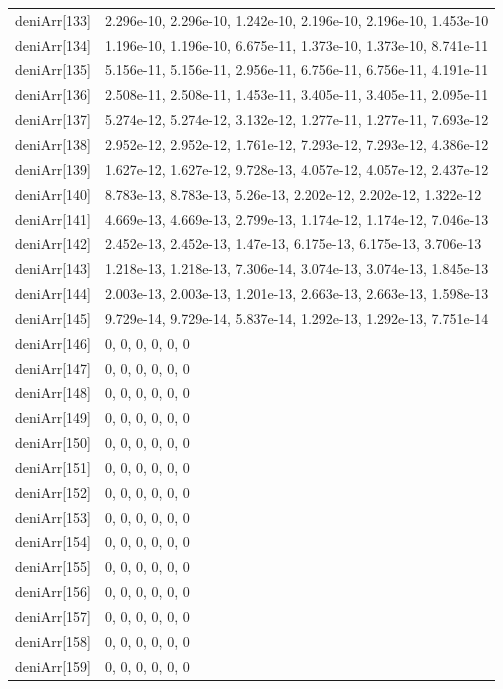 {\begin{longtable}{p{}p{}}
{}deniArr[133] & 2.296e-10, 2.296e-10, 1.242e-10, 2.196e-10, 2.196e-10, 1.453e-10\\
{}deniArr[134] & 1.196e-10, 1.196e-10, 6.675e-11, 1.373e-10, 1.373e-10, 8.741e-11\\
{}deniArr[135] & 5.156e-11, 5.156e-11, 2.956e-11, 6.756e-11, 6.756e-11, 4.191e-11\\
{}deniArr[136] & 2.508e-11, 2.508e-11, 1.453e-11, 3.405e-11, 3.405e-11, 2.095e-11\\
{}deniArr[137] & 5.274e-12, 5.274e-12, 3.132e-12, 1.277e-11, 1.277e-11, 7.693e-12\\
{}deniArr[138] & 2.952e-12, 2.952e-12, 1.761e-12, 7.293e-12, 7.293e-12, 4.386e-12\\
{}deniArr[139] & 1.627e-12, 1.627e-12, 9.728e-13, 4.057e-12, 4.057e-12, 2.437e-12\\
{}deniArr[140] & 8.783e-13, 8.783e-13, 5.26e-13, 2.202e-12, 2.202e-12, 1.322e-12\\
{}deniArr[141] & 4.669e-13, 4.669e-13, 2.799e-13, 1.174e-12, 1.174e-12, 7.046e-13\\
{}deniArr[142] & 2.452e-13, 2.452e-13, 1.47e-13, 6.175e-13, 6.175e-13, 3.706e-13\\
{}deniArr[143] & 1.218e-13, 1.218e-13, 7.306e-14, 3.074e-13, 3.074e-13, 1.845e-13\\
{}deniArr[144] & 2.003e-13, 2.003e-13, 1.201e-13, 2.663e-13, 2.663e-13, 1.598e-13\\
{}deniArr[145] & 9.729e-14, 9.729e-14, 5.837e-14, 1.292e-13, 1.292e-13, 7.751e-14\\
{}deniArr[146] & 0, 0, 0, 0, 0, 0\\
{}deniArr[147] & 0, 0, 0, 0, 0, 0\\
{}deniArr[148] & 0, 0, 0, 0, 0, 0\\
{}deniArr[149] & 0, 0, 0, 0, 0, 0\\
{}deniArr[150] & 0, 0, 0, 0, 0, 0\\
{}deniArr[151] & 0, 0, 0, 0, 0, 0\\
{}deniArr[152] & 0, 0, 0, 0, 0, 0\\
{}deniArr[153] & 0, 0, 0, 0, 0, 0\\
{}deniArr[154] & 0, 0, 0, 0, 0, 0\\
{}deniArr[155] & 0, 0, 0, 0, 0, 0\\
{}deniArr[156] & 0, 0, 0, 0, 0, 0\\
{}deniArr[157] & 0, 0, 0, 0, 0, 0\\
{}deniArr[158] & 0, 0, 0, 0, 0, 0\\
{}deniArr[159] & 0, 0, 0, 0, 0, 0\\

\end{longtable}}
